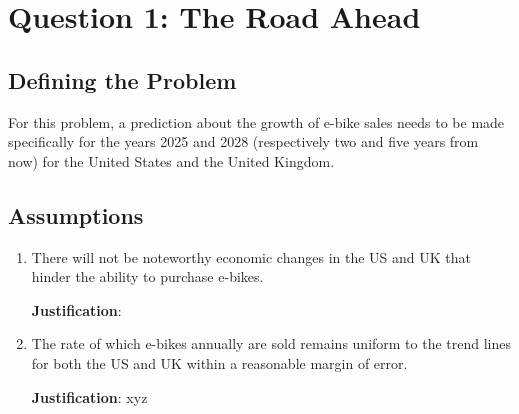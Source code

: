 \section{Question 1: The Road Ahead}
\subsection{Defining the Problem}
    For this problem, a prediction about the growth of e-bike sales needs to be made specifically for the years 2025 and 2028 (respectively two and five years from now) for the United States and the United Kingdom.
\subsection{Assumptions}
\begin{enumerate}
    \item There will not be noteworthy economic changes in the US and UK that hinder the ability to purchase e-bikes.

    \textbf{Justification}:
    \item The rate of which e-bikes annually are sold remains uniform to the trend lines for both the US and UK within a reasonable margin of error.

    \textbf{Justification}: xyz
\end{enumerate}
